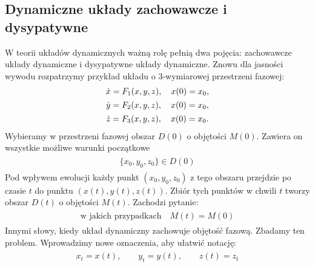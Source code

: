 \documentclass[a4paper,12pt,polish]{sphinxmanual}
\begin{document}
\subsection{Dynamiczne układy zachowawcze i dysypatywne}
\label{ch1/chI022:id1}
W teorii układów dynamicznych ważną rolę pełnią dwa pojęcia: zachowawcze układy dynamiczne i dysypatywne układy dynamiczne.  Znowu dla jasności wywodu rozpatrzymy przykład układu o 3-wymiarowej przestrzeni fazowej:
\label{ch1/chI022:equation-eqn19}\begin{gather}
\begin{split}\dot x = F_1(x, y, z), \quad x(0) = x_0,\end{split}\label{ch1/chI022-eqn19}\\\begin{split}\dot y = F_2(x, y, z),  \quad x(0) = x_0,\end{split}\notag\\\begin{split}\dot z = F_3(x, y, z),  \quad x(0) = x_0.\end{split}\notag
\end{gather}
Wybieramy w przestrzeni fazowej obszar $D(0)$  o objętości $M(0)$. Zawiera on wszystkie możliwe warunki początkowe
\label{ch1/chI022:equation-eqn20}\begin{gather}
\begin{split}\{x_0, y_0, z_0\} \in D(0)\end{split}\label{ch1/chI022-eqn20}
\end{gather}
Pod wpływem ewolucji każdy punkt $(x_0, y_0, z_0)$  z tego obszaru przejdzie po czasie $t$ do punktu $(x(t),  y(t), z(t))$.  Zbiór tych punktów w chwili $t$ tworzy obszar  $D(t)$  o objętości $M(t)$. Zachodzi pytanie:
\label{ch1/chI022:equation-eqn21}\begin{gather}
\begin{split} \mbox{w jakich przypadkach} \quad M(t) = M(0)\end{split}\label{ch1/chI022-eqn21}
\end{gather}
Innymi słowy, kiedy układ dynamiczny zachowuje objętość fazową. Zbadamy ten problem. Wprowadzimy nowe oznaczenia, aby ułatwić notację:
\label{ch1/chI022:equation-eqn22}\begin{gather}
\begin{split}x_t = x(t), \quad \quad y_t = y(t), \quad \quad z(t) = z_t\end{split}\label{ch1/chI022-eqn22}
\end{gather}
\end{document}
